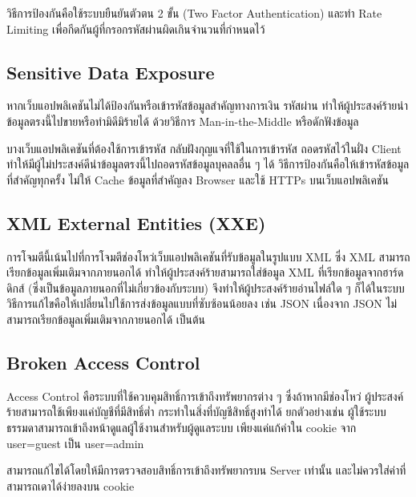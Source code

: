 วิธีการป้องกันคือใช้ระบบยืนยันตัวตน 2 ขั้น (Two Factor Authentication) \cite{wiki:multifac} และทำ Rate Limiting เพื่อกีดกันผู้ที่กรอกรหัสผ่านผิดเกินจำนวนที่กำหนดไว้

\subsection{Sensitive Data Exposure}
หากเว็บแอปพลิเคชันไม่ได้ป้องกันหรือเข้ารหัสข้อมูลสำคัญทางการเงิน รหัสผ่าน ทำให้ผู้ประสงค์ร้ายนำข้อมูลตรงนี้ไปขายหรือทำมิดีมิร้ายได้ ด้วยวิธีการ Man-in-the-Middle \cite{manmd} หรือดักฟังข้อมูล

บางเว็บแอปพลิเคชันที่ต้องใช้การเข้ารหัส กลับฝังกุญแจที่ใช้ในการเข้ารหัส ถอดรหัสไว้ในฝั่ง Client ทำให้มีผู้ไม่ประสงค์ดีนำข้อมูลตรงนี้ไปถอดรหัสข้อมูลบุคลลอื่น ๆ ได้
วิธีการป้องกันคือให้เข้ารหัสข้อมูลที่สำคัญทุกครั้ง ไม่ให้ Cache ข้อมูลที่สำคัญลง Browser และใช้ HTTPs บนเว็บแอปพลิเคชัน

\subsection{XML External Entities (XXE)}
การโจมตีนี้เน้นไปที่การโจมตีช่องโหว่เว็บแอปพลิเคชันที่รับข้อมูลในรูปแบบ XML \cite{wiki:xml} ซึ่ง XML สามารถเรียกข้อมูลเพิ่มเติมจากภายนอกได้ ทำให้ผู้ประสงค์ร้ายสามารถใส่ข้อมูล XML ที่เรียกข้อมูลจากฮาร์ดดิกส์ (ซึ่งเป็นข้อมูลภายนอกที่ไม่เกี่ยวข้องกับระบบ) จึงทำให้ผู้ประสงค์ร้ายอ่านไฟล์ใด ๆ ก็ได้ในระบบ \cite{xxe}
วิธีการแก้ไขคือให้เปลี่ยนไปใช้การส่งข้อมูลแบบที่ซับซ้อนน้อยลง เช่น JSON เนื่องจาก JSON ไม่สามารถเรียกข้อมูลเพิ่มเติมจากภายนอกได้ เป็นต้น

\subsection{Broken Access Control}

Access Control คือระบบที่ใช้ควบคุมสิทธิ์การเข้าถึงทรัพยากรต่าง ๆ ซึ่งถ้าหากมีช่องโหว่ ผู้ประสงค์ร้ายสามารถใช้เพียงแค่บัญชีที่มีสิทธิ์ต่ำ กระทำในสิ่งที่บัญชีสิทธิ์สูงทำได้ ยกตัวอย่างเช่น ผู้ใช้ระบบธรรมดาสามารถเข้าถึงหน้าดูแลผู้ใช้งานสำหรับผู้ดูแลระบบ เพียงแค่แก้ค่าใน cookie จาก user=guest เป็น user=admin

สามารถแก้ไขได้โดยให้มีการตรวจสอบสิทธิ์การเข้าถึงทรัพยากรบน Server เท่านั้น และไม่ควรใส่ค่าที่สามารถเดาได้ง่ายลงบน cookie

